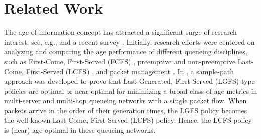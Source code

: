 

\section{Related Work}\label{sec_related_work}

The age of information concept has attracted a significant surge of research interest; see, e.g., \cite{SunAoIWorkshop2018,Song1990,KaulYatesGruteser-Infocom2012,2012CISS-KaulYatesGruteser,2012ISIT-YatesKaul,LiInfocom2015,6875100,CostaCodreanuEphremides_TIT, KamKompellaEphremidesTIT,Icc2015Pappas,2015ISITHuangModiano,Suninfocom2016,AgeOfInfo2016,Bedewy2016,BedewyJournal2017,Bedewy2017,BedewyMultihop2017,SunBook,Yates2016, AliTCOM2022,IgorAllerton2016,HsuTWC2017,Vishrant2017,Arunabh2019,He2018,8822722,8812616,9137714,8406891,SunMutualInformation2018,SunNonlinear2019,shisher2021age,ShisherMobiHoc22, shisher2023learning0, shisher2023learning, pan2022age, pan2022optimal, bedewy2021low, ornee2021sampling, bedewy2021optimal, tang2022sampling, ornee2023whittle, Kosta2017Age} and a recent survey \cite{yates2021AgeSurvey}. 
Initially, research efforts were centered on analyzing and comparing the age performance of different queueing disciplines, such as First-Come, First-Served (FCFS) \cite{KaulYatesGruteser-Infocom2012,2012ISIT-YatesKaul,KamKompellaEphremidesTIT,2015ISITHuangModiano}, preemptive and non-preemptive Last-Come, First-Served (LCFS) \cite{2012CISS-KaulYatesGruteser,Yates2016}, and packet management \cite{CostaCodreanuEphremides_TIT, Icc2015Pappas}. In \cite{Bedewy2016,BedewyJournal2017,Bedewy2017,BedewyMultihop2017,SunBook}, a sample-path approach was developed to prove that Last-Generated, First-Served (LGFS)-type policies are optimal or near-optimal for minimizing a broad class of age metrics in multi-server and multi-hop queueing networks with a single packet flow. When packets arrive in the order of their generation times, the LGFS policy becomes the well-known Last Come, First Served (LCFS) policy. Hence, the LCFS policy is (near) age-optimal in these queueing networks. 

